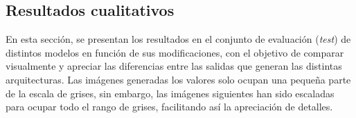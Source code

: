 \subsection{Resultados cualitativos}

En esta sección, se presentan los resultados en el conjunto de evaluación (\textit{test}) de distintos modelos en función de sus modificaciones, con el objetivo de comparar visualmente y apreciar las diferencias entre las salidas que generan las distintas arquitecturas. Las imágenes generadas los valores solo ocupan una pequeña parte de la escala de grises, sin embargo, las imágenes siguientes han sido escaladas para ocupar todo el rango de grises, facilitando así la apreciación de detalles. 





